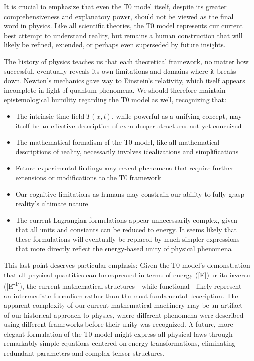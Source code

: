 \documentclass[12pt,a4paper]{article}
\newcommand{\Tfieldt}{T(x,t)}
\begin{document}
	It is crucial to emphasize that even the T0 model itself, despite its greater comprehensiveness and explanatory power, should not be viewed as the final word in physics. Like all scientific theories, the T0 model represents our current best attempt to understand reality, but remains a human construction that will likely be refined, extended, or perhaps even superseded by future insights.
	
	The history of physics teaches us that each theoretical framework, no matter how successful, eventually reveals its own limitations and domains where it breaks down. Newton's mechanics gave way to Einstein's relativity, which itself appears incomplete in light of quantum phenomena. We should therefore maintain epistemological humility regarding the T0 model as well, recognizing that:
	
	\begin{itemize}
		\item The intrinsic time field $\Tfieldt$, while powerful as a unifying concept, may itself be an effective description of even deeper structures not yet conceived
		
		\item The mathematical formalism of the T0 model, like all mathematical descriptions of reality, necessarily involves idealizations and simplifications
		
		\item Future experimental findings may reveal phenomena that require further extensions or modifications to the T0 framework
		
		\item Our cognitive limitations as humans may constrain our ability to fully grasp reality's ultimate nature
		
		\item The current Lagrangian formulations appear unnecessarily complex, given that all units and constants can be reduced to energy. It seems likely that these formulations will eventually be replaced by much simpler expressions that more directly reflect the energy-based unity of physical phenomena
	\end{itemize}
	
	This last point deserves particular emphasis: Given the T0 model's demonstration that all physical quantities can be expressed in terms of energy ([E]) or its inverse ([E\textsuperscript{-1}]), the current mathematical structures—while functional—likely represent an intermediate formalism rather than the most fundamental description. The apparent complexity of our current mathematical machinery may be an artifact of our historical approach to physics, where different phenomena were described using different frameworks before their unity was recognized. A future, more elegant formulation of the T0 model might express all physical laws through remarkably simple equations centered on energy transformations, eliminating redundant parameters and complex tensor structures.
	
\end{document}
